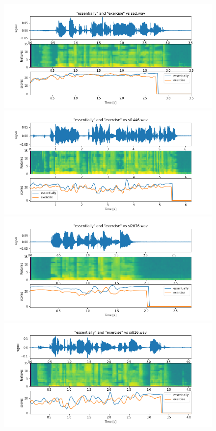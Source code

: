 \documentclass[11pt]{article}
\begin{document}
\begin{figure}[h]
	\includegraphics[width=\linewidth]{./docs/sa2.png}
	\includegraphics[width=\linewidth]{./docs/si1446.png}
	\includegraphics[width=\linewidth]{./docs/si2076.png}
	\includegraphics[width=\linewidth]{./docs/si816.png}

\end{figure}
\end{document}
